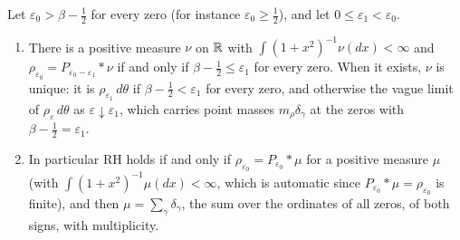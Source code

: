 \begin{theorem}\label{tf:thm:deconv}
Let $\varepsilon_0>\beta-\tfrac12$ for every zero (for instance $\varepsilon_0\ge\tfrac12$), and let $0\le\varepsilon_1<\varepsilon_0$.
\begin{enumerate}
\item[(a)] There is a positive measure $\nu$ on $\mathbb{R}$ with $\int(1+x^2)^{-1}\nu(dx)<\infty$ and $\rho_{\varepsilon_0}=P_{\varepsilon_0-\varepsilon_1}*\nu$ if and only if $\beta-\tfrac12\le\varepsilon_1$ for every zero. When it exists, $\nu$ is unique: it is $\rho_{\varepsilon_1}\,d\theta$ if $\beta-\tfrac12<\varepsilon_1$ for every zero, and otherwise the vague limit of $\rho_\varepsilon\,d\theta$ as $\varepsilon\downarrow\varepsilon_1$, which carries point masses $m_\rho\delta_\gamma$ at the zeros with $\beta-\tfrac12=\varepsilon_1$.
\item[(b)] In particular RH holds if and only if $\rho_{\varepsilon_0}=P_{\varepsilon_0}*\mu$ for a positive measure $\mu$ (with $\int(1+x^2)^{-1}\mu(dx)<\infty$, which is automatic since $P_{\varepsilon_0}*\mu=\rho_{\varepsilon_0}$ is finite), and then $\mu=\sum_\gamma\delta_\gamma$, the sum over the ordinates of all zeros, of both signs, with multiplicity.
\end{enumerate}
\end{theorem}

